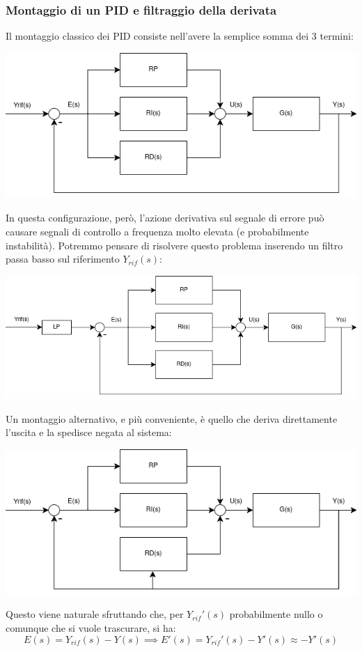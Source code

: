 \documentclass[a4paper,11pt]{article}
\begin{document}
\subsubsection{Montaggio di un PID e filtraggio della derivata}
Il montaggio classico dei PID consiste nell'avere la semplice somma dei 3 termini:
\begin{center}
	\includegraphics[scale=0.5]{../figures/pid.png}
\end{center}

In questa configurazione, però, l'azione derivativa sul segnale di errore può causare segnali di controllo a frequenza molto elevata (e probabilmente instabilità).
Potremmo pensare di risolvere questo problema inserendo un filtro passa basso sul riferimento $Y_{rif}(s)$:
\begin{center}
	\includegraphics[scale=0.5]{../figures/pid_filt.png}
\end{center}

Un montaggio alternativo, e più conveniente, è quello che deriva direttamente l'uscita e la spedisce negata al sistema:
\begin{center}
	\includegraphics[scale=0.5]{../figures/pid_deriv.png}
\end{center}
Questo viene naturale sfruttando che, per $Y_{rif}'(s)$ probabilmente nullo o comunque che si vuole trascurare, si ha:
$$
E(s) = Y_{rif}(s) - Y(s) \implies E'(s) = Y_{rif}'(s) - Y'(s) \approx - Y'(s)
$$
\end{document}
